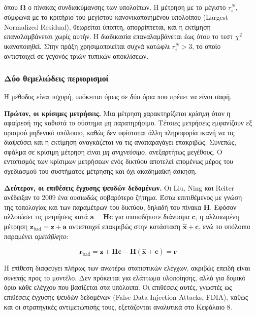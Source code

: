 όπου $\boldsymbol{\Omega}$ ο πίνακας συνδιακύμανσης των υπολοίπων. Η μέτρηση με το μέγιστο
$r_i^{N}$, σύμφωνα με το κριτήριο του μεγίστου κανονικοποιημένου υπολοίπου (Largest
Normalized Residual), θεωρείται ύποπτη, απορρίπτεται, και η εκτίμηση επαναλαμβάνεται χωρίς
αυτήν. Η διαδικασία επαναλαμβάνεται έως ότου το τεστ $\chi^2$ ικανοποιηθεί. Στην πράξη
χρησιμοποιείται συχνά κατώφλι $r_i^{N} > 3$, το οποίο αντιστοιχεί σε γεγονός τριών τυπικών
αποκλίσεων.

\subsubsection*{Δύο θεμελιώδεις περιορισμοί}

Η μέθοδος είναι ισχυρή, υπόκειται όμως σε δύο όρια που πρέπει να είναι σαφή.

\textbf{Πρώτον, οι κρίσιμες μετρήσεις.} Μια μέτρηση χαρακτηρίζεται \emph{κρίσιμη} όταν η
αφαίρεσή της καθιστά το σύστημα μη παρατηρήσιμο. Τέτοιες μετρήσεις εμφανίζουν εξ ορισμού
μηδενικό υπόλοιπο, καθώς δεν υφίσταται άλλη πληροφορία ικανή να τις διαψεύσει και η
εκτίμηση αναγκάζεται να τις αναπαραγάγει επακριβώς. Συνεπώς, σφάλμα σε κρίσιμη μέτρηση
είναι \emph{μη ανιχνεύσιμο}, ανεξαρτήτως μεγέθους. Ο εντοπισμός των κρίσιμων μετρήσεων ενός
δικτύου αποτελεί επομένως μέρος του σχεδιασμού του συστήματος μέτρησης και όχι ακαδημαϊκή
άσκηση.

\textbf{Δεύτερον, οι επιθέσεις έγχυσης ψευδών δεδομένων.} Οι Liu, Ning και Reiter ανέδειξαν
το 2009 ένα ουσιωδώς σοβαρότερο ζήτημα. Έστω επιτιθέμενος με γνώση της τοπολογίας και των
παραμέτρων του δικτύου, δηλαδή του πίνακα $\mathbf{H}$. Εφόσον αλλοιώσει τις μετρήσεις κατά
$\mathbf{a} = \mathbf{H}\mathbf{c}$ για οποιοδήποτε διάνυσμα $\mathbf{c}$, η αλλοιωμένη
μέτρηση $\mathbf{z}_{\text{bad}} = \mathbf{z} + \mathbf{a}$ αντιστοιχεί επακριβώς στην
κατάσταση $\hat{\mathbf{x}} + \mathbf{c}$, ενώ το υπόλοιπο παραμένει \emph{αμετάβλητο}:

\begin{equation}
\mathbf{r}_{\text{bad}} = \mathbf{z} + \mathbf{H}\mathbf{c}
        - \mathbf{H}(\hat{\mathbf{x}} + \mathbf{c}) = \mathbf{r}
\label{eq:fdia}
\end{equation}

Η επίθεση διαφεύγει πλήρως των ανωτέρω στατιστικών ελέγχων, ακριβώς επειδή είναι
\emph{συνεπής} προς το μοντέλο. Δεν πρόκειται για ελάττωμα υλοποίησης, αλλά για δομικό όριο
κάθε ελέγχου που βασίζεται στα υπόλοιπα. Οι επιθέσεις αυτές, γνωστές ως επιθέσεις έγχυσης
ψευδών δεδομένων (False Data Injection Attacks, FDIA), καθώς και οι στρατηγικές
αντιμετώπισής τους, εξετάζονται αναλυτικά στο Κεφάλαιο 8.

